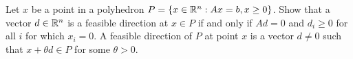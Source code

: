 
Let $x$ be a point in a polyhedron $P=\left\{ x \in \mathbb{R}^n : Ax =  b, x \ge 0 \right \}$. Show that a vector $d \in \mathbb{R}^n$ is a feasible direction at $x \in P$ if and only if $ Ad = 0$ and $d_i\ge 0$ for all $i$ for which $x_i = 0$.  A feasible direction of $P$ at point $x$ is a vector $d \neq 0$ such that $x + \theta d \in P$ for some $\theta > 0$.
